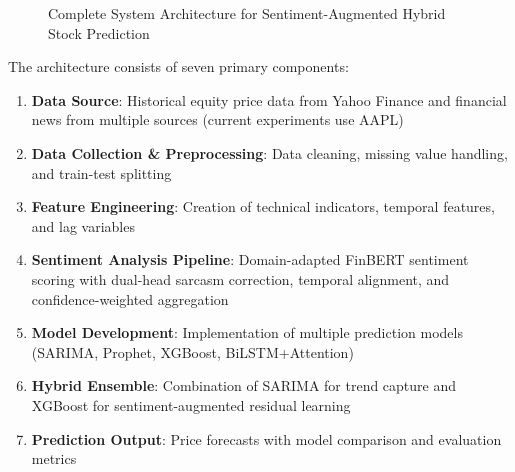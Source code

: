 \documentclass[12pt,a4paper]{article}
\begin{document}
\begin{figure}[htbp]
{
    }
    \caption{Complete System Architecture for Sentiment-Augmented Hybrid Stock Prediction}
    \label{fig:system_architecture}
\end{figure}

The architecture consists of seven primary components:

\begin{enumerate}
    \item \textbf{Data Source}: Historical equity price data from Yahoo Finance and financial news from multiple sources (current experiments use AAPL)
    \item \textbf{Data Collection \& Preprocessing}: Data cleaning, missing value handling, and train-test splitting
    \item \textbf{Feature Engineering}: Creation of technical indicators, temporal features, and lag variables
    \item \textbf{Sentiment Analysis Pipeline}: Domain-adapted FinBERT sentiment scoring with dual-head sarcasm correction, temporal alignment, and confidence-weighted aggregation
    \item \textbf{Model Development}: Implementation of multiple prediction models (SARIMA, Prophet, XGBoost, BiLSTM+Attention)
    \item \textbf{Hybrid Ensemble}: Combination of SARIMA for trend capture and XGBoost for sentiment-augmented residual learning
    \item \textbf{Prediction Output}: Price forecasts with model comparison and evaluation metrics
\end{enumerate}
\end{document}
